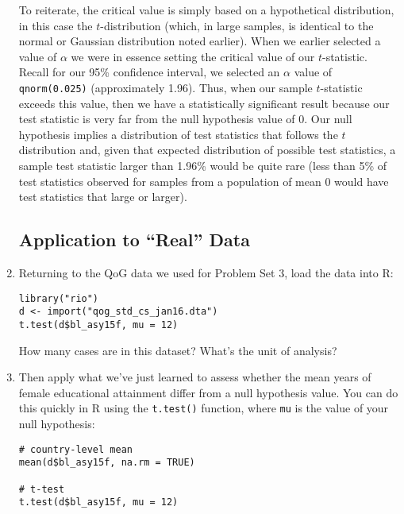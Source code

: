 \documentclass[a4paper,12pt]{article}
\begin{document}
\begin{enumerate}
\vspace{4em}

\noindent To reiterate, the critical value is simply based on a hypothetical distribution, in this case the $t$-distribution (which, in large samples, is identical to the normal or Gaussian distribution noted earlier). When we earlier selected a value of $\alpha$ we were in essence setting the critical value of our $t$-statistic. Recall for our 95\% confidence interval, we selected an $\alpha$ value of \texttt{qnorm(0.025)} (approximately 1.96). Thus, when our sample $t$-statistic exceeds this value, then we have a statistically significant result because our test statistic is very far from the null hypothesis value of 0. Our null hypothesis implies a distribution of test statistics that follows the $t$ distribution and, given that expected distribution of possible test statistics, a sample test statistic larger than 1.96\% would be quite rare (less than 5\% of test statistics observed for samples from a population of mean 0 would have test statistics that large or larger).

\vspace{2em}

\subsection{Application to ``Real'' Data}

\item Returning to the QoG data we used for Problem Set 3, load the data into R:

\begin{verbatim}
library("rio")
d <- import("qog_std_cs_jan16.dta")
t.test(d$bl_asy15f, mu = 12)
\end{verbatim}

\noindent How many cases are in this dataset? What's the unit of analysis?

\item Then apply what we've just learned to assess whether the mean years of female educational attainment differ from a null hypothesis value. You can do this quickly in R using the \texttt{t.test()} function, where \texttt{mu} is the value of your null hypothesis:

\begin{verbatim}
# country-level mean
mean(d$bl_asy15f, na.rm = TRUE)

# t-test
t.test(d$bl_asy15f, mu = 12)
\end{verbatim}


\end{enumerate}
\end{document}
